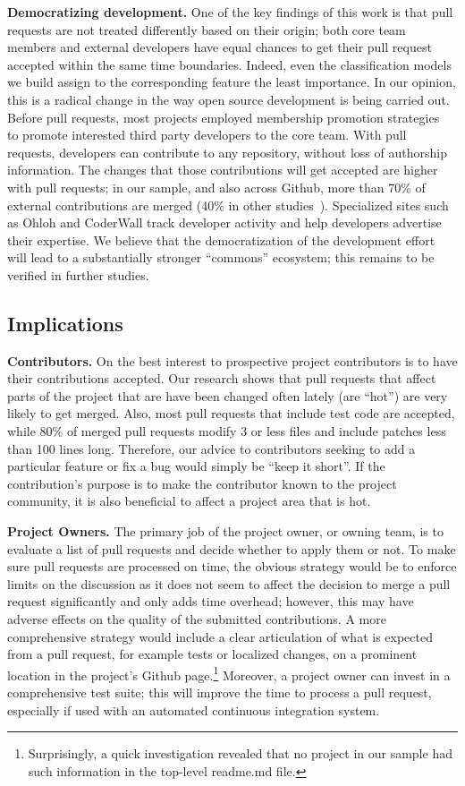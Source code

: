 \documentclass{acm_proc_article-sp}
\begin{document}
\textbf{Democratizing development.} One of the key findings of this work is
that pull requests are not treated differently based on their origin; both core
team members and external developers have equal chances to get their pull
request accepted within the same time boundaries. Indeed, even the
classification models we build assign to the corresponding feature the least
importance. In our opinion, this is a radical change in the way open source
development is being carried out. Before pull requests, most projects employed
membership promotion strategies~\cite{Jense07} to promote interested third party
developers to the core team. With pull requests, developers can contribute to
any repository, without loss of authorship information. The changes that those
contributions will get accepted are higher with pull requests; in our sample,
and also across Github, more than 70\% of external contributions are merged
(40\% in other studies~\cite{Rigby06, Weiss08}).  Specialized sites such as
Ohloh and CoderWall track developer activity and help developers advertise their
expertise. We believe that the democratization of the development effort will
lead to a substantially stronger ``commons'' ecosystem; this remains to be
verified in further studies.

\subsection{Implications}

\textbf{Contributors.}
On the best interest to prospective project contributors is to have their
contributions accepted. Our research shows that pull requests that affect parts
of the project that are have been changed often lately (are ``hot'') are very
likely to get merged. Also, most pull requests that include test code are
accepted, while 80\% of merged pull requests modify 3 or less files and include
patches less than 100 lines long. Therefore, our advice to contributors seeking
to add a particular feature or fix a bug would simply be ``keep it short''. If the contribution's purpose is to make the contributor known
to the project community, it is also beneficial to affect a project area that is
hot.

\textbf{Project Owners.} The primary job of the project owner, or owning team,
is to evaluate a list of pull requests and decide whether to apply them or not.
To make sure pull requests are processed on time, the obvious strategy would be
to enforce limits on the discussion as it does not seem to affect the decision
to merge a pull request significantly and only adds time overhead; however, this
may have adverse effects on the quality of the submitted contributions. A more
comprehensive strategy would include a clear articulation of what is expected
from a pull request, for example tests or localized changes, on a prominent
location in the project's Github page.\footnote{Surprisingly, a quick
investigation revealed that no project in our sample had such information in
the top-level {\sc readme}.md file.} Moreover, a project owner can invest in a
comprehensive test suite; this will improve the time to process a pull request,
especially if used with an automated continuous integration system.
\end{document}
